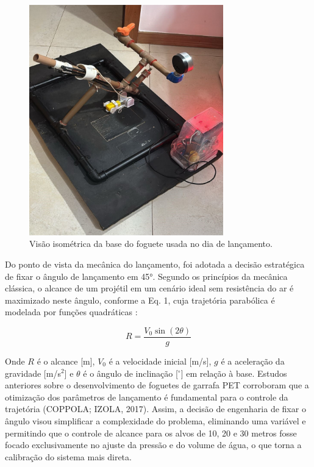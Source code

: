 \begin{figure}[H]
	\centering
	\includegraphics[width=0.75\textwidth,height=\textheight,keepaspectratio]{figuras/estruturas/base_foguete.png}
	\caption{Visão isométrica da base do foguete usada no dia de lançamento.}
	\label{fig_visao_base}
\end{figure}

Do ponto de vista da mecânica do lançamento, foi adotada a decisão estratégica de fixar o ângulo de lançamento em 45°. Segundo os princípios da mecânica clássica, o alcance de um projétil em um cenário ideal sem resistência do ar é maximizado neste ângulo, conforme a Eq. 1, cuja trajetória parabólica é modelada por funções quadráticas \cite{araujo2023}:

\begin{equation}
R = \frac{V_0 \sin(2\theta)}{g}
\end{equation}

Onde $R$ é o alcance [m], $V_0$ é a velocidade inicial [m/s], $g$ é a aceleração da gravidade [m/s$^2$] e $\theta$ é o ângulo de inclinação [$^\circ$] em relação à base. Estudos anteriores sobre o desenvolvimento de foguetes de garrafa PET corroboram que a otimização dos parâmetros de lançamento é fundamental para o controle da trajetória (COPPOLA; IZOLA, 2017). Assim, a decisão de engenharia de fixar o ângulo visou simplificar a complexidade do problema, eliminando uma variável e permitindo que o controle de alcance para os alvos de 10, 20 e 30 metros fosse focado exclusivamente no ajuste da pressão e do volume de água, o que torna a calibração do sistema mais direta. 

